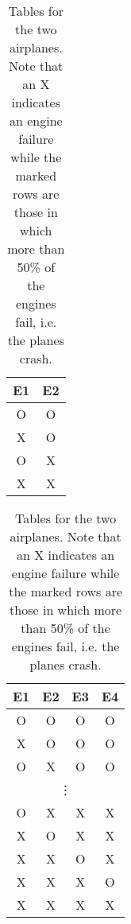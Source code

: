 \documentclass[../main/Notes.tex]{subfiles}
\begin{document}
\begin{table}[h]
  \centering
  \begin{subtable}[t]{.45\linewidth}
  \centering
  \vspace{0pt}
    \begin{tabular}{cc}
    E1 & E2 \\
    \hline
    O & O \\
    X & O \\
    O & X \\
    X & X \\
    \end{tabular}
  \caption{two engine plane}
  \end{subtable}
  \hfill
  \begin{subtable}[t]{.45\linewidth}
  \centering
    \begin{tabular}{cccc}
    E1 & E2 & E3 & E4 \\
    \hline
    O & O & O & O \\
    X & O & O & O \\
    O & X & O & O \\
    \multicolumn{4}{c}{\vdots} \\
    O & X & X & X \\
    X & O & X & X \\
    X & X & O & X \\
    X & X & X & O \\
    X & X & X & X 
    \end{tabular}
  \caption{four engine plane}
  \end{subtable}
  
\caption{Tables for the two airplanes. Note that an X indicates an engine failure while the marked rows are those in which more than 50\% of the engines fail, i.e. the planes crash.}
\label{tab:2014-06-06_planes}
\end{table}
\end{document}
